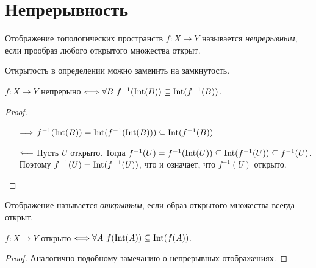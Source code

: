 \section{Непрерывность}

\begin{definition}
	Отображение топологических пространств $f \colon X \to Y$ называется
	\textit{непрерывным}, если прообраз любого открытого множества открыт.
\end{definition}

\begin{remark}
	Открытость в определении можно заменить на замкнутость.
\end{remark}

\begin{remark}
	$f \colon X \to Y$ непрерыно $\Longleftrightarrow \forall B~ f^{-1}(\operatorname{Int}(B)) \subseteq
	\operatorname{Int}(f^{-1}(B))$.
\end{remark}
\begin{proof}
	\enewline
	\begin{itemize}
		\item[$\Longrightarrow$] $f^{-1}(\operatorname{Int}(B)) = \operatorname{Int}(f^{-1}(\operatorname{Int}(B))) \subseteq \operatorname{Int}(f^{-1}(B))$
		\item[$\Longleftarrow$] Пусть $U$ открыто. Тогда
			$f^{-1}(U) = f^{-1}(\operatorname{Int}(U)) \subseteq \operatorname{Int}(f^{-1}(U)) \subseteq f^{-1}(U)$.
			Поэтому $f^{-1}(U) = \operatorname{Int}(f^{-1}(U))$, что и означает, что $f^{-1}(U)$
			открыто.
	\end{itemize}
\end{proof}


\begin{definition}
	Отображение называется \textit{открытым}, если образ открытого множества
	всегда открыт.
\end{definition}

\begin{remark}
	$f \colon X \to Y$ открыто $\Longleftrightarrow \forall A~ f(\operatorname{Int}(A)) \subseteq \operatorname{Int}(f(A))$.
\end{remark}
\begin{proof}
	Аналогично подобному замечанию о непрерывных отображениях.
\end{proof}

